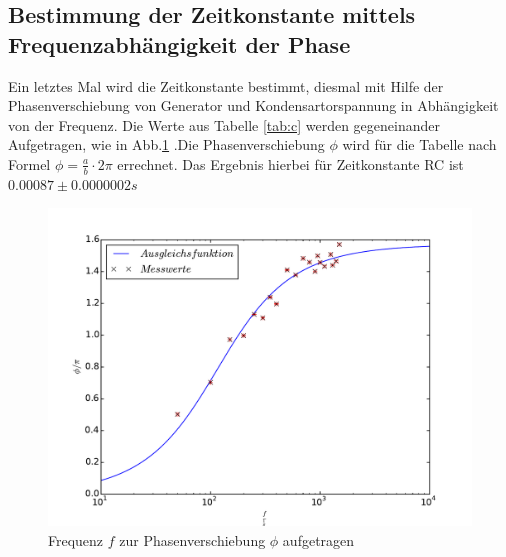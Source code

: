 \subsection{Bestimmung der Zeitkonstante mittels Frequenzabhängigkeit der Phase}
Ein letztes Mal wird die Zeitkonstante bestimmt, diesmal mit Hilfe der Phasenverschiebung von Generator und Kondensartorspannung in Abhängigkeit von der Frequenz.
Die Werte aus Tabelle \ref{tab:c} werden gegeneinander Aufgetragen, wie in Abb.\ref{abb:c} .Die Phasenverschiebung $\phi$ wird für
die Tabelle nach Formel $\phi=\frac{a}{b}\cdot2\pi$ errechnet.
Das Ergebnis hierbei für Zeitkonstante RC ist $0.00087\pm0.0000002 s$
\begin{figure}[h]
  \centering
  \includegraphics[width=1\textwidth]{c.pdf}
  \caption{Frequenz $f$ zur Phasenverschiebung $\phi$ aufgetragen}
  \label{abb:c}
\end{figure}
